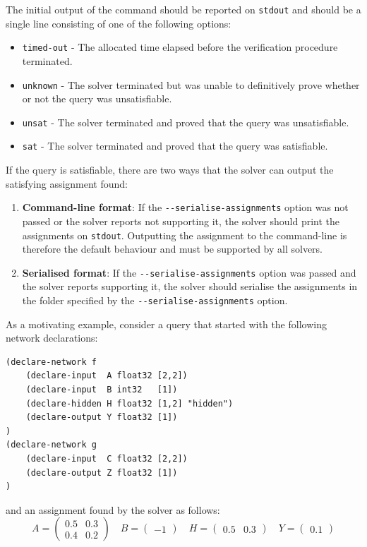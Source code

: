 \noindent The initial output of the command should be reported on \texttt{stdout} and should be a single line consisting of one of the following options: 
\begin{itemize}
\item \texttt{timed-out} - The allocated time elapsed before the verification procedure terminated.
\item \texttt{unknown} - The solver terminated but was unable to definitively prove whether or not the query was unsatisfiable.
\item \texttt{unsat} - The solver terminated and proved that the query was unsatisfiable.
\item \texttt{sat} - The solver terminated and proved that the query was satisfiable.
\end{itemize}
If the query is satisfiable, there are two ways that the solver can output the satisfying assignment found:
\begin{enumerate}
\item \textbf{Command-line format}: If the \texttt{{-}-serialise-assignments} option was not passed or the solver reports not supporting it, the solver should print the assignments on \texttt{stdout}. Outputting the assignment to the command-line is therefore the default behaviour and must be supported by all solvers.
\item \textbf{Serialised format}: If the \texttt{{-}-serialise-assignments} option was passed and the solver reports supporting it, the solver should serialise the assignments in the folder specified by the \texttt{{-}-serialise-assignments} option.
\end{enumerate}
As a motivating example, consider a \vnnlib{} query that started with the following network declarations:
\begin{lstlisting}[style=bash]
(declare-network f
    (declare-input  A float32 [2,2])
    (declare-input  B int32   [1])
    (declare-hidden H float32 [1,2] "hidden")
    (declare-output Y float32 [1])
)
(declare-network g
    (declare-input  C float32 [2,2])
    (declare-output Z float32 [1])
)
\end{lstlisting}
and an assignment found by the solver as follows:
\begin{equation*}
A = \begin{pmatrix}
0.5 & 0.3 \\
0.4 & 0.2
\end{pmatrix}
\quad
B = \begin{pmatrix}
-1
\end{pmatrix}
\quad
H = \begin{pmatrix}
0.5 & 0.3
\end{pmatrix}
\quad
Y = \begin{pmatrix}
0.1
\end{pmatrix}
\end{equation*}
